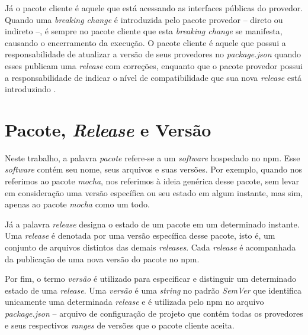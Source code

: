 Já o pacote cliente é aquele que está acessando as interfaces públicas do provedor. Quando uma \textit{breaking change} é introduzida pelo pacote provedor -- direto ou indireto --, é sempre no pacote cliente que esta \textit{breaking change} se manifesta, causando o encerramento da execução. O pacote cliente é aquele que possui a responsabilidade de atualizar a versão de seus provedores no \textit{package.json} quando esses publicam uma \textit{release} com correções, enquanto que o pacote provedor possui a responsabilidade de indicar o nível de compatibilidade que sua nova \textit{release} está introduzindo \cite{teorical_reference:semver}.

\section{Pacote, \textit{Release} e Versão}
\label{ref-teo:pac_rel_ver}
Neste trabalho, a palavra \textit{pacote} refere-se a um \textit{software} hospedado no \gls{npm}. Esse \textit{software} contém seu nome, seus arquivos e suas versões. Por exemplo, quando nos referimos ao pacote \textit{mocha}, nos referimos à ideia genérica desse pacote, sem levar em consideração uma versão específica ou seu estado em algum instante, mas sim, apenas ao pacote \textit{mocha} como um todo.

Já a palavra \textit{release} designa o estado de um pacote em um determinado instante. Uma \textit{release} é denotada por uma versão específica desse pacote, isto é, um conjunto de arquivos distintos das demais \textit{releases}. Cada \textit{release} é acompanhada da publicação de uma nova versão do pacote no \gls{npm}.

Por fim, o termo \textit{versão} é utilizado para especificar e distinguir um determinado estado de uma \textit{release}. Uma \textit{versão} é uma \textit{string} no padrão \textit{SemVer} que identifica unicamente uma determinada \textit{release} e é utilizada pelo \gls{npm} no arquivo \textit{package.json} -- arquivo de configuração de projeto que contém todas os provedores e seus respectivos \textit{ranges} de versões que o pacote cliente aceita.

